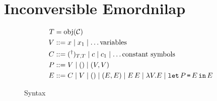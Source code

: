 \documentclass[runningheads,envcountsame]{llncs}
\begin{document}
\section{Inconversible Emordnilap}

\begin{figure}
    \centering
    \begin{align}
        T &= \mathrm{obj}(\C) \\
        V &::= x \mid x_1 \mid \dots \text{variables} \\
        C &::= (\rev{})_{T,T} \mid c \mid c_1 \mid \dots \text{constant symbols} \\
        P &::= V \mid \eunit \mid \epair{V}{V} \\
        E &::= C \mid V \mid \eunit \mid \epair{E}{E} \mid \eapp{E}{E} \mid \elam{V}{E} \mid \elet{P}{E}{E}
    \end{align}
    \caption{Syntax}
    \label{fig:syntax1}
\end{figure}
\end{document}
